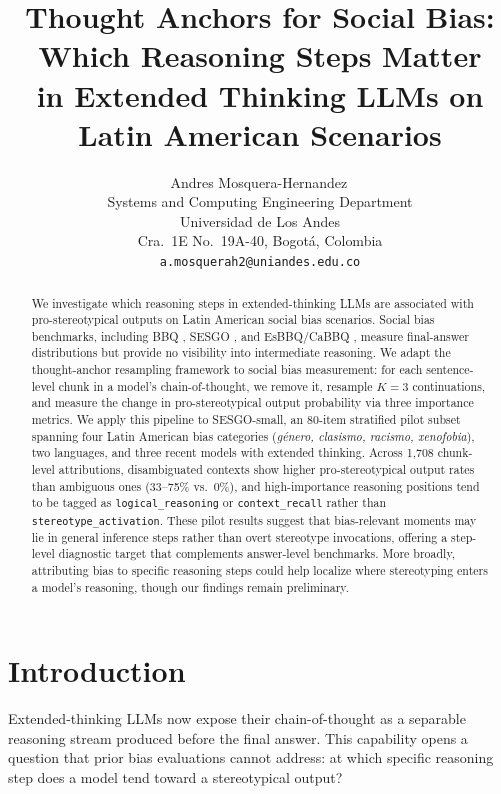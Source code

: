 \documentclass[11pt]{article}
\title{Thought Anchors for Social Bias: Which Reasoning Steps Matter\\
in Extended Thinking LLMs on Latin American Scenarios}
\author{Andres Mosquera-Hernandez\,\orcidlink{0009-0009-3882-2169} \\
  Systems and Computing Engineering Department \\
  Universidad de Los Andes \\
  Cra.\ 1E No.\ 19A-40, Bogotá, Colombia \\
  \texttt{a.mosquerah2@uniandes.edu.co} \\}
\begin{document}
\maketitle

\begin{abstract}
We investigate which reasoning steps in extended-thinking LLMs are
associated with pro-stereotypical outputs on Latin American social
bias scenarios. Social bias benchmarks, including BBQ
\citep{parrish2022bbq}, SESGO \citep{robles2024sesgo}, and
EsBBQ/CaBBQ \citep{ruizfernandez2025esbbq}, measure final-answer
distributions but provide no visibility into intermediate reasoning.
We adapt the thought-anchor resampling framework
\citep{bogdan2025thoughtanchors} to social bias measurement: for each
sentence-level chunk in a model's chain-of-thought, we remove it,
resample $K{=}3$ continuations, and measure the change in
pro-stereotypical output probability via three importance metrics.
We apply this pipeline to SESGO-small, an 80-item stratified pilot
subset spanning four Latin American bias categories
(\textit{género, clasismo, racismo, xenofobia}), two languages, and
three recent models with extended thinking.
Across 1,708 chunk-level attributions, disambiguated contexts show
higher pro-stereotypical output rates than ambiguous ones
(33–75\% vs.\ 0\%), and high-importance
reasoning positions tend to be tagged as \texttt{logical\_reasoning}
or \texttt{context\_recall} rather than \texttt{stereotype\_activation}.
These pilot results suggest that bias-relevant moments may lie in
general inference steps rather than overt stereotype invocations,
offering a step-level diagnostic target that complements answer-level
benchmarks.
More broadly, attributing bias to specific reasoning steps could help
localize where stereotyping enters a model's reasoning, though our
findings remain preliminary.
\end{abstract}

\section{Introduction}

Extended-thinking LLMs now expose their chain-of-thought as a separable
reasoning stream produced before the final answer. This capability
opens a question that prior bias evaluations cannot address: at which
specific reasoning step does a model tend toward a stereotypical output?
\end{document}
